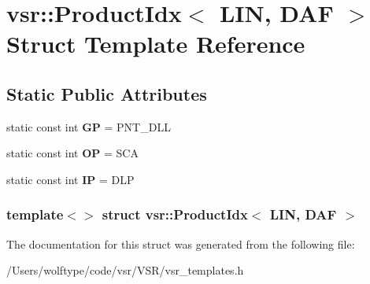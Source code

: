 \hypertarget{structvsr_1_1_product_idx_3_01_l_i_n_00_01_d_a_f_01_4}{\section{vsr\-:\-:Product\-Idx$<$ L\-I\-N, D\-A\-F $>$ Struct Template Reference}
\label{structvsr_1_1_product_idx_3_01_l_i_n_00_01_d_a_f_01_4}
}
\subsection*{Static Public Attributes}
\begin{DoxyCompactItemize}
\item 
\hypertarget{structvsr_1_1_product_idx_3_01_l_i_n_00_01_d_a_f_01_4_a768622cb1a6f33ffb487e36a10e44e12}{static const int {\bfseries G\-P} = P\-N\-T\-\_\-\-D\-L\-L}\label{structvsr_1_1_product_idx_3_01_l_i_n_00_01_d_a_f_01_4_a768622cb1a6f33ffb487e36a10e44e12}

\item 
\hypertarget{structvsr_1_1_product_idx_3_01_l_i_n_00_01_d_a_f_01_4_ad98ece5eff4a3c240735fc424dd2c8a7}{static const int {\bfseries O\-P} = S\-C\-A}\label{structvsr_1_1_product_idx_3_01_l_i_n_00_01_d_a_f_01_4_ad98ece5eff4a3c240735fc424dd2c8a7}

\item 
\hypertarget{structvsr_1_1_product_idx_3_01_l_i_n_00_01_d_a_f_01_4_af68b033c2857a25cacef6fd2eb62c7f4}{static const int {\bfseries I\-P} = D\-L\-P}\label{structvsr_1_1_product_idx_3_01_l_i_n_00_01_d_a_f_01_4_af68b033c2857a25cacef6fd2eb62c7f4}

\end{DoxyCompactItemize}
\subsubsection*{template$<$$>$ struct vsr\-::\-Product\-Idx$<$ L\-I\-N, D\-A\-F $>$}



The documentation for this struct was generated from the following file\-:\begin{DoxyCompactItemize}
\item 
/\-Users/wolftype/code/vsr/\-V\-S\-R/vsr\-\_\-templates.\-h\end{DoxyCompactItemize}
